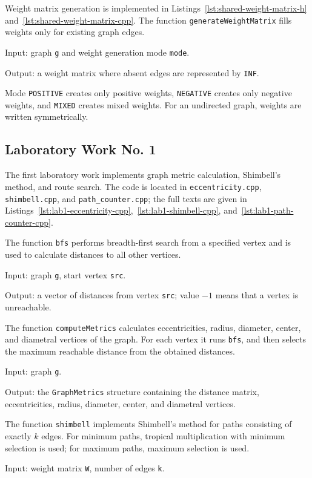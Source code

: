 \documentclass[a4paper,final]{article}
\begin{document}
Weight matrix generation is implemented in Listings~\ref{lst:shared-weight-matrix-h} and~\ref{lst:shared-weight-matrix-cpp}. The function \texttt{generateWeightMatrix} fills weights only for existing graph edges.

Input: graph \texttt{g} and weight generation mode \texttt{mode}.

Output: a weight matrix where absent edges are represented by \texttt{INF}.

Mode \texttt{POSITIVE} creates only positive weights, \texttt{NEGATIVE} creates only negative weights, and \texttt{MIXED} creates mixed weights. For an undirected graph, weights are written symmetrically.

\subsection{Laboratory Work No. 1}

The first laboratory work implements graph metric calculation, Shimbell's method, and route search. The code is located in \texttt{eccentricity.cpp}, \texttt{shimbell.cpp}, and \texttt{path\_counter.cpp}; the full texts are given in Listings~\ref{lst:lab1-eccentricity-cpp},~\ref{lst:lab1-shimbell-cpp}, and~\ref{lst:lab1-path-counter-cpp}.

The function \texttt{bfs} performs breadth-first search from a specified vertex and is used to calculate distances to all other vertices.

Input: graph \texttt{g}, start vertex \texttt{src}.

Output: a vector of distances from vertex \texttt{src}; value $-1$ means that a vertex is unreachable.

The function \texttt{computeMetrics} calculates eccentricities, radius, diameter, center, and diametral vertices of the graph. For each vertex it runs \texttt{bfs}, and then selects the maximum reachable distance from the obtained distances.

Input: graph \texttt{g}.

Output: the \texttt{GraphMetrics} structure containing the distance matrix, eccentricities, radius, diameter, center, and diametral vertices.

The function \texttt{shimbell} implements Shimbell's method for paths consisting of exactly $k$ edges. For minimum paths, tropical multiplication with minimum selection is used; for maximum paths, maximum selection is used.

Input: weight matrix \texttt{W}, number of edges \texttt{k}.
\end{document}
